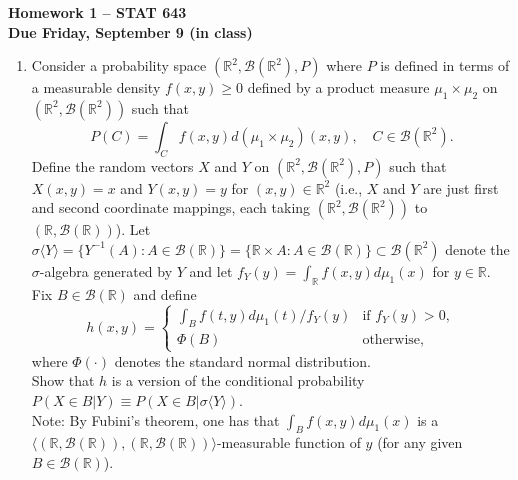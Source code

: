 \documentclass[11pt]{article}
\begin{document}
\vspace{6cm}
\begin{center}\Large \textbf{Homework 1 -- STAT 643} \\
\normalsize \textbf{Due Friday, September 9 (in class)}
\end{center}

\begin{enumerate} \itemsep .5cm
\item Consider a probability space $(\mathbb{R}^2,\mathcal{B}(\mathbb{R}^2),P)$ where $P$ is defined in terms of a measurable density $f(x,y) \geq 0$ defined by a product measure $\mu_1\times \mu_2$ on $(\mathbb{R}^2,\mathcal{B}(\mathbb{R}^2))$  such that
    \[
      P(C) = \int_C  f(x,y) d(\mu_{1}\times \mu_2)(x,y),\quad C \in \mathcal{B}(\mathbb{R}^2).
    \]
Define the random vectors $X$ and $Y$ on $(\mathbb{R}^2,\mathcal{B}(\mathbb{R}^2),P)$  such that $X(x,y)=x$
 and $Y(x,y)=y$ for $(x,y)\in \mathbb{R}^2$ (i.e., $X$ and $Y$ are just first and second coordinate mappings, each taking $(\mathbb{R}^2,\mathcal{B}(\mathbb{R}^2))$ to $(\mathbb{R},\mathcal{B}(\mathbb{R}))$).  Let $\sigma \langle  Y\rangle =\{ Y^{-1}(A): A \in \mathcal{B}(\mathbb{R}) \} = \{ \mathbb{R}\times A: A\in  \mathcal{B}(\mathbb{R})\} \subset \mathcal{B}(\mathbb{R}^2) $ denote the  $\sigma$-algebra generated by $Y$
 and let $f_Y(y) = \int_{\mathbb{R}} f(x,y) d \mu_1(x)$ for $y\in\mathbb{R}$.  Fix $B\in\mathcal{B}(\mathbb{R})$ and define
 \[
     h(x,y) = \left\{ \begin{array}{cl}
     \int_B f(t,y) d \mu_1(t) /f_Y(y) &\mbox{if $f_Y(y)>0$},\\
     \Phi(B) &\mbox{otherwise},
   \end{array}  \right.
 \]
 where $\Phi(\cdot)$ denotes the standard normal distribution. \\[.1cm]
 Show that $h$ is a version of the conditional probability $P(X\in B|Y)\equiv P( X\in B| \sigma \langle  Y\rangle)$.\\[.2cm]
 Note: By Fubini's theorem, one has that $\int_B f(x,y) d \mu_1(x)$ is  a $ \langle(\mathbb{R},\mathcal{B}(\mathbb{R})),(\mathbb{R},\mathcal{B}(\mathbb{R}))\rangle $-measurable function of $y$ (for any given $B\in\mathcal{B}(\mathbb{R})$).




















\end{enumerate}
\end{document}

